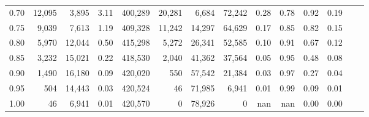 \begin{tabular}{rrrrrrrrrrrrrr}
0.70 &  12,095 &   3,895 &      3.11 &  400,289 &   20,281 &   6,684 &  72,242 &  0.28 &  0.78 &  0.92 &      0.19 \\
0.75 &   9,039 &   7,613 &      1.19 &  409,328 &   11,242 &  14,297 &  64,629 &  0.17 &  0.85 &  0.82 &      0.15 \\
0.80 &   5,970 &  12,044 &      0.50 &  415,298 &    5,272 &  26,341 &  52,585 &  0.10 &  0.91 &  0.67 &      0.12 \\
0.85 &   3,232 &  15,021 &      0.22 &  418,530 &    2,040 &  41,362 &  37,564 &  0.05 &  0.95 &  0.48 &      0.08 \\
0.90 &   1,490 &  16,180 &      0.09 &  420,020 &      550 &  57,542 &  21,384 &  0.03 &  0.97 &  0.27 &      0.04 \\
0.95 &     504 &  14,443 &      0.03 &  420,524 &       46 &  71,985 &   6,941 &  0.01 &  0.99 &  0.09 &      0.01 \\
1.00 &      46 &   6,941 &      0.01 &  420,570 &        0 &  78,926 &       0 &   nan &   nan &  0.00 &      0.00 \\
\bottomrule
\end{tabular}
